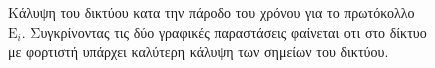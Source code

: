 \begin{figure}[H]
  \centering
  \caption{Κάλυψη του δικτύου κατα την πάροδο του χρόνου για το πρωτόκολλο $\text{E}_{i}$. Συγκρίνοντας τις δύο γραφικές παραστάσεις φαίνεται οτι στο δίκτυο με
φορτιστή
υπάρχει καλύτερη κάλυψη των σημείων του δικτύου.}
  \label{fig:5_1exp_3_3}
\end{figure}





